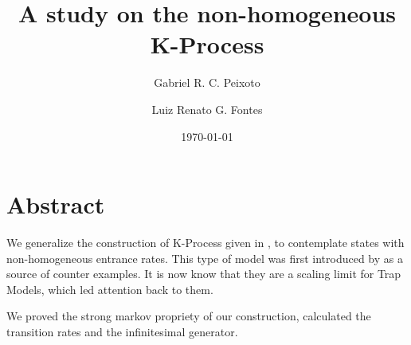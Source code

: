 \documentclass[11pt,a4paper]{article}
\title{A study on the non-homogeneous K-Process}
\author{
  Gabriel R. C. Peixoto
  \and
  Luiz Renato G. Fontes
}
\date{\today}
\begin{document}
\maketitle


\section*{Abstract}

We generalize the construction of K-Process given in \cite{fontes:08},
to contemplate states with non-homogeneous entrance rates. This type
of model was first introduced by \cite{kolmogorov:51} as a source of
counter examples. It is now know that they are a scaling limit for
Trap Models, which led attention back to them.

We proved the strong markov propriety of our construction, calculated
the transition rates and the infinitesimal generator.


\singlespacing


\end{document}
